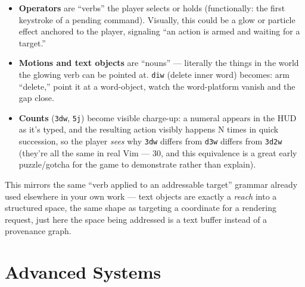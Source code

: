 \documentclass[11pt]{article}
\providecommand{\tightlist}{%
  \setlength{\itemsep}{0pt}\setlength{\parskip}{0pt}}
\begin{document}
\begin{itemize}
\tightlist
\item
  \textbf{Operators} are ``verbs'' the player selects or holds (functionally: the
  first keystroke of a pending command). Visually, this could be a glow or
  particle effect anchored to the player, signaling ``an action is armed and
  waiting for a target.''
\item
  \textbf{Motions and text objects} are ``nouns'' --- literally the things in the world
  the glowing verb can be pointed at. \texttt{diw} (delete inner word) becomes: arm
  ``delete,'' point it at a word-object, watch the word-platform vanish and the
  gap close.
\item
  \textbf{Counts} (\texttt{3dw}, \texttt{5j}) become visible charge-up: a numeral appears in the
  HUD as it's typed, and the resulting action visibly happens N times in quick
  succession, so the player \emph{sees} why \texttt{3dw} differs from \texttt{d3w} differs from
  \texttt{3d2w} (they're all the same in real Vim --- 30, and this equivalence is a
  great early puzzle/gotcha for the game to demonstrate rather than explain).
\end{itemize}

This mirrors the same ``verb applied to an addressable target'' grammar already
used elsewhere in your own work --- text objects are exactly a \emph{reach} into a
structured space, the same shape as targeting a coordinate for a rendering
request, just here the space being addressed is a text buffer instead of a
provenance graph.

\hypertarget{sec-advanced-systems}{%
\section{Advanced Systems}\label{sec-advanced-systems}}
\end{document}
